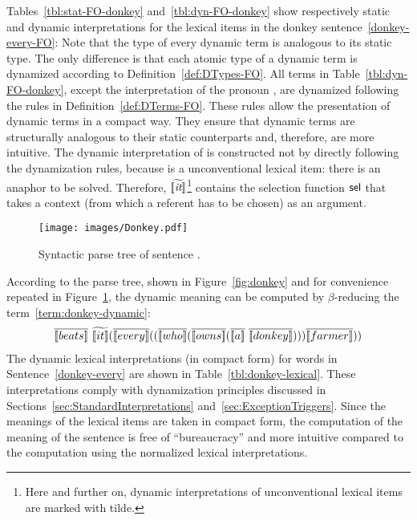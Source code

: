 Tables~\ref{tbl:stat-FO-donkey} and~\ref{tbl:dyn-FO-donkey} show respectively static and dynamic interpretations for the lexical items in the donkey sentence~\eqref{donkey-every-FO}:
Note that the type of every dynamic term is analogous to its static type. The only difference is that each atomic type of a dynamic term is dynamized according to Definition~\ref{def:DTypes-FO}. All terms in Table~\ref{tbl:dyn-FO-donkey}, except the interpretation of the pronoun , are dynamized following the rules in Definition~\ref{def:DTerms-FO}. These rules allow the presentation of dynamic terms in a compact way. They ensure that dynamic terms are structurally analogous to their static counterparts and, therefore, are more intuitive. The dynamic interpretation of  is constructed not by directly following the dynamization rules, because  is a unconventional lexical item: there is an anaphor to be solved. Therefore, $\widetilde{[\![\textit{it}]\!]}$\footnote{Here and further on, dynamic interpretations of unconventional lexical items are marked with tilde.} contains the selection function $\mathsf{sel}$ that takes a context (from which a referent has to be chosen) as an argument.



\begin{figure}[h!]
 \centering
    \texttt{[image: images/Donkey.pdf]}
\caption{Syntactic parse tree of sentence .} \label{fig:donkey-copy}
\end{figure}

According to the parse tree, shown in Figure~\ref{fig:donkey} and for convenience repeated in Figure~\ref{fig:donkey-copy}, the dynamic meaning can be computed by $\beta$-reducing the term~\eqref{term:donkey-dynamic}:
\begin{align}
\tr{\I{beats}}  \ \etr{\I{it}} (\tr{\I{every}} ( (\tr{\I{who}}  (\tr{\I{owns}}  (\tr{\I{a}} \ \tr{\I{donkey}} ) ) ) \tr{\I{farmer}}  )) \label{term:donkey-dynamic}
\end{align}
The dynamic lexical interpretations (in compact form) for words in Sentence~\eqref{donkey-every} are shown in Table~\ref{tbl:donkey-lexical}. These interpretations comply with dynamization principles discussed in Sections~\ref{sec:StandardInterpretations} and~\ref{sec:ExceptionTriggers}. Since the meanings of the lexical items are taken in compact form, the computation of the meaning of the sentence is free of ``bureaucracy'' and more intuitive compared to the computation using the normalized lexical interpretations. 




